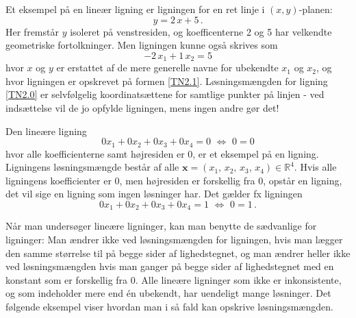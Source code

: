 \begin{example}
Et eksempel på en lineær ligning er ligningen for en ret linje i $(x,y)$-planen: 
\begin{equation}\label{TN2.0}
y = 2\, x + 5\,. 
\end{equation}
Her fremstår $y$ isoleret på venstresiden, og koefficenterne 2 og 5 har velkendte geometriske fortolkninger. Men ligningen kunne også skrives som
\begin{equation}
-2\, x_1 + 1\,x_2 = 5
\end{equation}
hvor $x$ og $y$ er erstattet af de mere generelle navne for ubekendte $x_1$ og $x_2$, og hvor ligningen er opskrevet på formen \eqref{TN2.1}.\bs
Løsningsmængden for ligning \eqref{TN2.0} er selvfølgelig koordinatsættene for samtlige punkter på linjen - ved indsættelse vil de jo opfylde ligningen, mens ingen andre gør det!
\end{example}


\begin{example}
Den lineære ligning
\begin{equation}
0x_1+0x_2+0x_3+0x_4=0\,\,\Leftrightarrow\,\,0=0
\end{equation}
hvor alle koefficienterne samt højresiden er $0$, er et eksempel på en  ligning. Ligningens løsningsmængde består af alle $\mathbf x=(x_1,\,x_2,\,x_3,\,x_4) \in \mathbb R^4$.\bs
Hvis alle ligningens koefficienter er $0$, men højresiden er forskellig fra $0$, opstår en  ligning, det vil sige en ligning som ingen løsninger har. Det gælder fx ligningen
\begin{equation}
0x_1+0x_2+0x_3+0x_4=1\,\,\Leftrightarrow\,\,0=1\,.
\end{equation}
\end{example}

Når man undersøger lineære ligninger, kan man benytte de sædvanlige  for ligninger: Man ændrer ikke ved løsningsmængden for ligningen, hvis man lægger den samme størrelse til på begge sider af lighedstegnet, og man ændrer heller ikke ved løsningsmængden hvis man ganger på begge sider af lighedstegnet med en konstant som er forskellig fra $0$.\bs
Alle lineære ligninger som ikke er inkonsistente, og som indeholder mere end én ubekendt, har uendeligt mange løsninger. Det følgende eksempel viser hvordan man i så fald kan opskrive løsnings\-mæng\-den.

